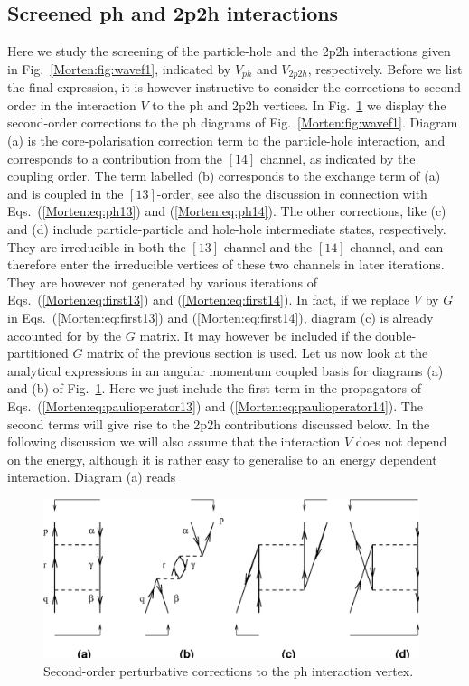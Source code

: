 \subsection{Screened ph  and 2p2h interactions}


Here we study the screening of the particle-hole
and the 2p2h interactions given in Fig.~\ref{Morten:fig:wavef1},
indicated by $V_{ph}$ and $V_{2p2h}$, respectively.
Before we list the final expression, it is however instructive
to consider the corrections to second order in the interaction $V$ to the ph
and 2p2h vertices. 
In Fig.~\ref{Morten:fig:phvertex} we display the second-order
corrections to the ph diagrams of Fig.~\ref{Morten:fig:wavef1}.
Diagram (a) is the core-polarisation correction term to the
particle-hole interaction, and corresponds to a contribution from the
$[14]$ channel, as indicated by the coupling order.  The term labelled
(b) corresponds to the exchange term of (a) and is coupled in the
$[13]$-order, see also the discussion in connection with
Eqs.~(\ref{Morten:eq:ph13}) and (\ref{Morten:eq:ph14}).  The other
corrections, like (c) and (d) include particle-particle and hole-hole
intermediate states, respectively.  They are irreducible in both the
$[13]$ channel and the $[14]$ channel, and can therefore enter the
irreducible vertices of these two channels in later iterations.  They
are however not generated by various iterations of
Eqs.~(\ref{Morten:eq:first13}) and (\ref{Morten:eq:first14}). In fact,
if we replace $V$ by $G$ in Eqs.~(\ref{Morten:eq:first13}) and
(\ref{Morten:eq:first14}), diagram (c) is already accounted for by the
$G$ matrix. It may however be included if the double-partitioned $G$
matrix of the previous section is used.  Let us now look at the
analytical expressions in an angular momentum coupled basis for
diagrams (a) and (b) of Fig.~\ref{Morten:fig:phvertex}. Here we just
include the first term in the propagators of
Eqs.~(\ref{Morten:eq:paulioperator13}) and
(\ref{Morten:eq:paulioperator14}). The second terms will give rise to
the 2p2h contributions discussed below. In the following discussion we
will also assume that the interaction $V$ does not depend on the
energy, although it is rather easy to generalise to an energy
dependent interaction.  Diagram (a) reads
\begin{figure}%
	\begin{center}
      	\includegraphics[width=11cm]{secph.eps}
	\end{center}
      \caption{Second-order perturbative corrections to the ph
               interaction vertex.}
      \label{Morten:fig:phvertex}
\end{figure}
